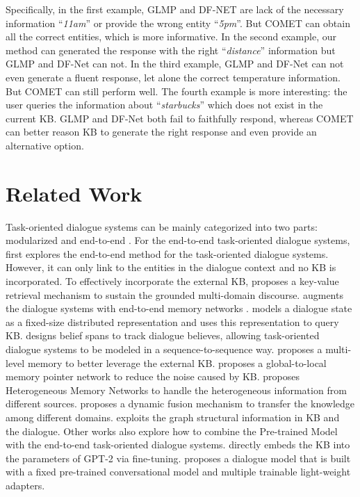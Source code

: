 \documentclass[11pt]{article}
\begin{document}
Specifically, 
in the first example, GLMP and DF-NET are lack of the necessary information ``\textit{11am}'' or provide the wrong entity ``\textit{5pm}''. But COMET can obtain all the correct entities, 
which is more informative. 
In the second example, our method can generated the response with the right ``\textit{distance}'' information but GLMP and DF-Net can not.
In the third example, GLMP and DF-Net can not even generate a fluent response, let alone the correct temperature information. But COMET can still perform well. 
The fourth example is more interesting: the user queries the information about ``\textit{starbucks}'' which does not exist in the current KB. GLMP and DF-Net both fail to faithfully respond, whereas COMET can better reason KB to generate the right response and even provide an alternative option.



\section{Related Work}
\label{sec:related_work}

Task-oriented dialogue systems can be mainly categorized into two parts: modularized \cite{williams2007partially,wen-etal-2017-network} and  end-to-end \cite{eric-manning-2017-copy}. 
For the end-to-end task-oriented dialogue systems, \cite{eric-manning-2017-copy} first explores the end-to-end method for the task-oriented dialogue systems. However, it can only link to the entities in the dialogue context and no KB is incorporated. 
To effectively incorporate the external KB, \cite{eric-etal-2017-key} proposes a key-value retrieval mechanism to sustain the grounded multi-domain discourse. 
\cite{madotto-etal-2018-mem2seq} augments the dialogue systems with end-to-end memory networks \cite{sukhbaatar-2015-memory}. 
\cite{wen-etal-2018-sequence} models a dialogue state as a fixed-size distributed representation and uses this representation to query KB. 
\cite{lei-etal-2018-sequicity} designs belief spans to track dialogue believes, allowing task-oriented dialogue systems to be modeled in a sequence-to-sequence way. 
\cite{gangi-reddy-etal-2019-multi} proposes a multi-level memory to better leverage the external KB.
\cite{wu2018globaltolocal} proposes a global-to-local memory pointer network to reduce the noise caused by KB.
\cite{lin-etal-2019-task} proposes Heterogeneous Memory Networks to handle the heterogeneous information from different sources.
\cite{qin-etal-2020-dynamic} proposes a dynamic fusion mechanism to transfer the knowledge among different domains. 
\cite{yang-etal-2020-graphdialog} exploits the graph structural information in KB and the dialogue.
Other works also explore how to combine the Pre-trained Model \cite{devlin2018bert,radford2019language} with the end-to-end task-oriented dialogue systems. \cite{madotto2020learning} directly embeds the KB into the parameters of GPT-2 \cite{radford2019language} via fine-tuning. 
\cite{madotto2020adapter} proposes a dialogue model that is built with a fixed pre-trained conversational model and multiple trainable light-weight adapters. 
\end{document}
